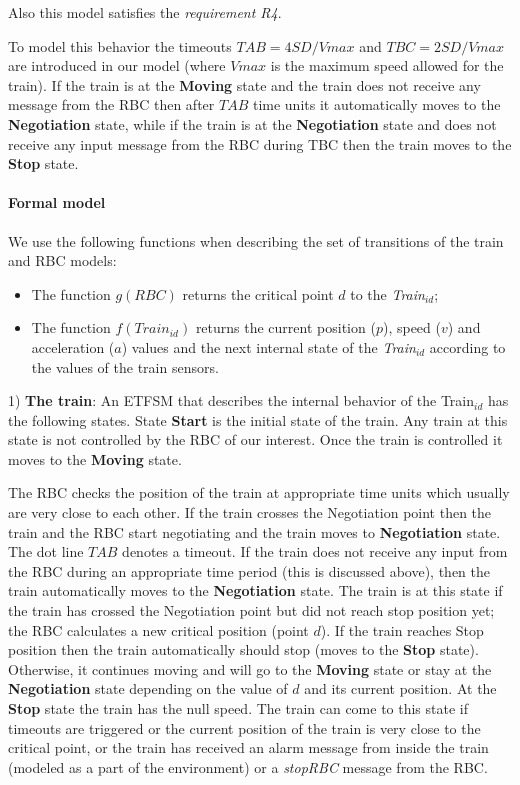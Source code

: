 \documentclass{template/openetcs_article}
\begin{document}
Also this model satisfies the \textit{requirement R4}.

To model this behavior the timeouts $TAB = 4 SD/Vmax$ and $TBC = 2 SD/Vmax$ are introduced in our model (where $Vmax$ is the maximum speed allowed for the train). If the train is at the \textbf{Moving} state and the train does not receive any message from the RBC then after $TAB$ time units it automatically moves to the \textbf{Negotiation} state, while if the train is at the \textbf{Negotiation} state and does not receive any input message from the RBC during TBC then the train moves to the \textbf{Stop} state.

\paragraph{Formal model}

We use the following functions when describing the set of transitions of the train and RBC models:

\begin{itemize}
\item The function $g(RBC)$ returns the critical point $d$ to the \textit{Train$_{id}$};
\item The function $f(Train_{id})$ returns the current position ($p$), speed ($v$) and acceleration ($a$) values and the next internal state of the \textit{Train$_{id}$} according to the values of the train sensors.
\end{itemize}

1) \textbf{The train}: An ETFSM that describes the internal behavior of the Train$_{id}$ has the following states. State \textbf{Start} is the initial state of the train. Any train at this state is not controlled by the RBC of our interest. Once the train is controlled it moves to the \textbf{Moving} state.

The RBC checks the position of the train at appropriate time units which usually are very close to each other. If the train crosses the Negotiation point then the train and the RBC start negotiating and the train moves to \textbf{Negotiation} state. The dot line $TAB$ denotes a timeout. If the train does not receive any input from the RBC during an appropriate time period (this is discussed above), then the train automatically moves to the \textbf{Negotiation} state.  The train is at this state if the train has crossed the Negotiation point but did not reach stop position yet; the RBC calculates a new critical position (point $d$).  If the train reaches Stop position then the train automatically should stop (moves to the \textbf{Stop} state). Otherwise, it continues moving and will go to the \textbf{Moving} state or stay at the \textbf{Negotiation} state depending on the value of $d$ and its current position. At the \textbf{Stop} state the train has the null speed. The train can come to this state if timeouts are triggered or the current position of the train is very close to the critical point, or the train has received an alarm message from inside the train (modeled as a part of the environment) or a \textit{stopRBC} message from the RBC.
\end{document}
